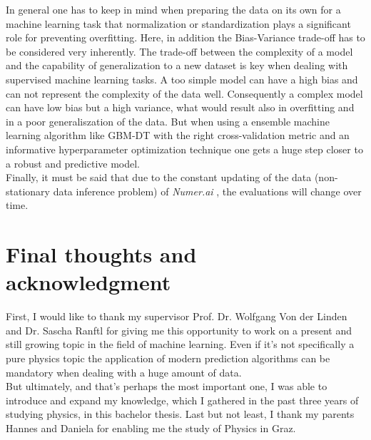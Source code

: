 \documentclass[12pt, a4paper]{article}
\begin{document}
In general one has to keep in mind when preparing the data on its own for a machine learning task that normalization or standardization plays a significant role for preventing overfitting. Here, in addition the Bias-Variance trade-off has to be considered very inherently. The trade-off between the complexity of a model and the capability of generalization to a new dataset is key when dealing with supervised machine learning tasks. A too simple model can have a high bias and can not represent the complexity of the data well. Consequently a complex model can have low bias but a high variance, what would result also in overfitting and in a poor generaliszation of the data. But when using a ensemble machine learning algorithm like GBM-DT with the right cross-validation metric and an informative hyperparameter optimization technique one gets a huge step closer to a robust and predictive model. \\
Finally, it must be said that due to the constant updating of the data (non-stationary data inference problem) of \textit{Numer.ai} \cite{Numerai}, the evaluations will change over time.
\section{Final thoughts and acknowledgment}
First, I would like to thank my supervisor Prof. Dr. Wolfgang Von der Linden and Dr. Sascha Ranftl for giving me this opportunity to work on a present and still growing topic in the field of machine learning. Even if it's not specifically a pure physics topic the application of modern prediction algorithms can be mandatory when dealing with a huge amount of data. \\
But ultimately, and that's perhaps the most important one, I was able to
introduce and expand my knowledge, which I gathered in the past three years of studying physics, in this bachelor thesis. Last but not least, I thank my parents Hannes and Daniela for enabling me the study of Physics in Graz.
\newpage
\printbibliography
\newpage
\listoffigures
\end{document}
